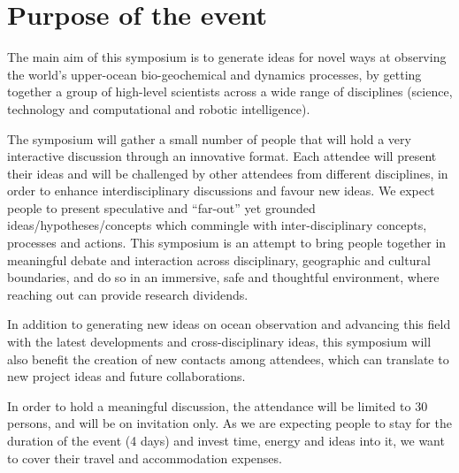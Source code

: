 \section{Purpose of the event}

The main aim of this symposium is to generate ideas for novel ways at
observing the world’s upper-ocean bio-geochemical and dynamics
processes, by getting together a group of high-level scientists across a
wide range of disciplines (science, technology and computational and
robotic intelligence).

The symposium will gather a small number of people that will hold a very
interactive discussion through an innovative format. Each attendee will
present their ideas and will be challenged by other attendees from
different disciplines, in order to enhance interdisciplinary discussions
and favour new ideas. We expect people to present speculative and
“far-out” yet grounded ideas/hypotheses/concepts which commingle with
inter-disciplinary concepts, processes and actions. This symposium is an
attempt to bring people together in meaningful debate and interaction
across disciplinary, geographic and cultural boundaries, and do so in an
immersive, safe and thoughtful environment, where reaching out can
provide research dividends.

In addition to generating new ideas on ocean observation and advancing
this field with the latest developments and cross-disciplinary ideas,
this symposium will also benefit the creation of new contacts among
attendees, which can translate to new project ideas and future
collaborations.

In order to hold a meaningful discussion, the attendance will be limited
to 30 persons, and will be on invitation only. As we are expecting
people to stay for the duration of the event (4 days) and invest time,
energy and ideas into it, we want to cover their travel and
accommodation expenses.
